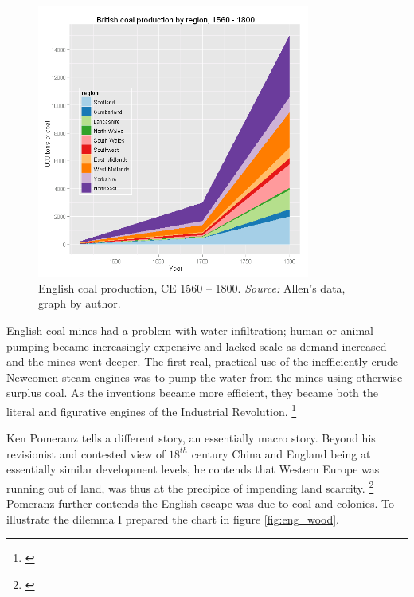 \documentclass[12pt]{article}
\numberwithin{equation}{section}
\begin{document}
		\begin{figure}[htb]
		\centering
		\includegraphics[width=0.8\textwidth]{allen_coal.png}
		\caption{English coal production, CE 1560 -- 1800. \textit{Source:} Allen's data, graph by author.}
		\label{fig:allen_coal}
		\end{figure}


		English coal mines had a problem with water infiltration; human or animal pumping became increasingly expensive and lacked scale as demand increased and the mines went deeper. The first real, practical use of the inefficiently crude Newcomen steam engines was to pump the water from the mines using otherwise surplus coal. As the inventions became more efficient, they became both the literal and figurative engines of the Industrial Revolution. \footnote{\citet[pp.~86 -- 93]{allen_british_2009}}
		
		Ken Pomeranz tells a different story, an essentially macro story. Beyond his revisionist and contested view of $18^{th}$ century China and England being at essentially similar development levels, he contends that Western Europe was running out of land, was thus at the precipice of impending land scarcity. \footnote{\citet[p.~264]{allen_british_2009}} Pomeranz further contends the English escape was due to coal and colonies. To illustrate the dilemma I prepared the chart in figure  \ref{fig:eng_wood}. 
		
\end{document}
